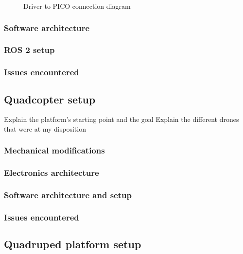 \documentclass[11pt]{article}
\begin{document}
                
                
                \begin{figure}
                    \centering
                    Driver to PICO connection diagram
                    \label{fig:driver_to_pico}
                \end{figure}

            
            
                \subsubsection{Software architecture}

            \subsubsection{ROS 2 setup}
            \subsubsection{Issues encountered}


        \subsection{Quadcopter setup}
                
                Explain the platform's starting point and the goal
                Explain the different drones that were at my disposition
                \subsubsection{Mechanical modifications}
    
                \subsubsection{Electronics architecture}
    
                \subsubsection{Software architecture and setup}
    
            
                \subsubsection{Issues encountered}
                
                \subsection{Quadruped platform setup}
        \newpage
\end{document}
